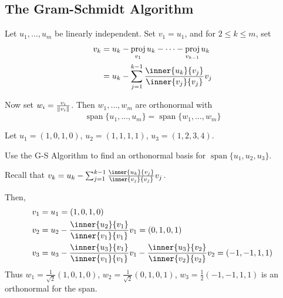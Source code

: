 \documentclass{article}
\DeclareMathOperator{\spn}{span}
\DeclareMathOperator{\proj}{proj}
\begin{document}
\subsection{The Gram-Schmidt Algorithm}
\begin{theorem}
  Let $u_1, \ldots, u_m$ be linearly independent. Set $v_1 = u_1$, and for $2 \leq k \leq m$, set
  \begin{align*}
    v_k & = u_k - \proj_{v_1}u_k - \dots - \proj_{v_{k-1}}u_k                   \\
        & = u_k - \sum_{j=1}^{k-1} \frac{\inner{u_k}{v_j}}{\inner{v_j}{v_j}}v_j
  \end{align*}

  Now set $w_i = \frac{v_i}{\norm{v_i}}$. Then $w_1, \ldots, w_m$ are orthonormal with \[
    \spn \{u_1, \ldots, u_m\} = \spn\{w_1, \ldots, w_m\}
  \]
\end{theorem}
\begin{example}
  Let $u_1 = (1, 0, 1, 0)$, $u_2 = (1, 1, 1, 1)$, $u_3 = (1, 2, 3, 4)$.

  Use the G-S Algorithm to find an orthonormal basis for $\spn\{u_1, u_2, u_3\}$.

  Recall that $v_k = u_k - \sum_{j=1}^{k-1} \frac{\inner{u_k}{v_j}}{\inner{v_j}{v_j}}v_j$.

  Then,
  \begin{align*}
    v_1 & = u_1 = (1, 0, 1, 0)                                                                                                 \\
    v_2 & = u_2 - \frac{\inner{u_2}{v_1}}{\inner{v_1}{v_1}}v_1 = (0, 1, 0, 1)                                                  \\
    v_3 & = u_3 - \frac{\inner{u_3}{v_1}}{\inner{v_1}{v_1}}v_1 - \frac{\inner{u_3}{v_2}}{\inner{v_2}{v_2}}v_2 = (-1, -1, 1, 1) \\
  \end{align*}
  Thus $w_1 = \frac{1}{\sqrt{2}}(1, 0, 1, 0)$, $w_2 = \frac{1}{\sqrt{2}}(0, 1, 0, 1)$, $w_3 = \frac{1}{2}(-1, -1, 1, 1)$ is an orthonormal for the span.
\end{example}
\end{document}
